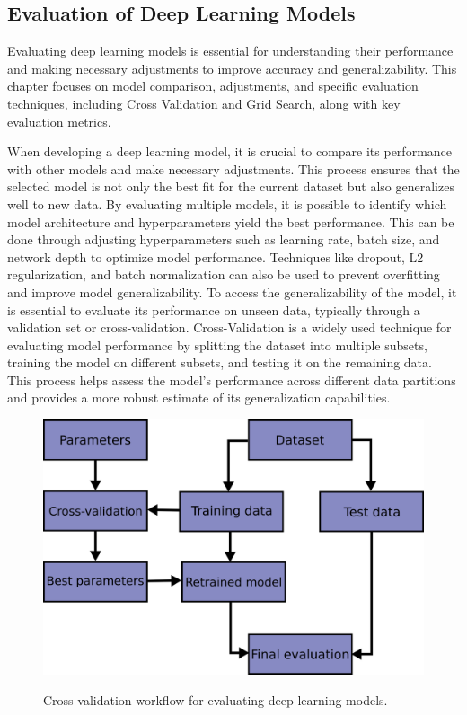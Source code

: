 \subsection{Evaluation of Deep Learning Models}
\label{sec:Evaluation of Deep Learning Models}

Evaluating deep learning models is essential for understanding their performance and making necessary adjustments to improve accuracy and generalizability. This chapter focuses on model comparison, adjustments, and specific evaluation techniques, including Cross Validation and Grid Search, along with key evaluation metrics.

When developing a deep learning model, it is crucial to compare its performance with other models and make necessary adjustments. This process ensures that the selected model is not only the best fit for the current dataset but also generalizes well to new data. By evaluating multiple models, it is possible to identify which model architecture and hyperparameters yield the best performance. This can be done through adjusting hyperparameters such as learning rate, batch size, and network depth to optimize model performance. Techniques like dropout, L2 regularization, and batch normalization can also be used to prevent overfitting and improve model generalizability. To access the generalizability of the model, it is essential to evaluate its performance on unseen data, typically through a validation set or cross-validation. Cross-Validation is a widely used technique for evaluating model performance by splitting the dataset into multiple subsets, training the model on different subsets, and testing it on the remaining data. This process helps assess the model's performance across different data partitions and provides a more robust estimate of its generalization capabilities.

\begin{figure}[hbt]
    \centering
    \begin{minipage}[t]{\textwidth}
    \caption{Cross-validation workflow for evaluating deep learning models.}
    \includegraphics[width=.8\textwidth]{img/cross_validation_workflow.png}\\
    \label{fig:cross-validation-workflow}
    \end{minipage}
\end{figure}

